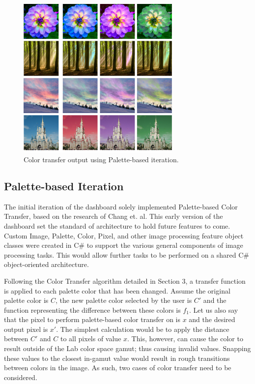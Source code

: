 \documentclass[sigchi]{acmart}
\begin{document}
\begin{figure}[t]
	\includegraphics[width=8cm]{Diffs}
	\caption{Color transfer output using Palette-based iteration.}
\end{figure}

\subsection{Palette-based Iteration}

The initial iteration of the dashboard solely implemented Palette-based Color Transfer, based on the research of Chang et. al. This early version of the dashboard set the standard of architecture to hold future features to come. Custom Image, Palette, Color, Pixel, and other image processing feature object classes were created in C\# to support the various general components of image processing tasks. This would allow further tasks to be performed on a shared C\# object-oriented architecture.

Following the Color Transfer algorithm detailed in Section 3, a transfer function is applied to each palette color that has been changed. Assume the original palette color is \(C\), the new palette color selected by the user is \(C'\) and the function representing the difference between these colors is \(f_1\). Let us also say that the pixel to perform palette-based color transfer on is \(x\) and the desired output pixel is \(x'\). The simplest calculation would be to apply the distance between \(C'\) and \(C\) to all pixels of value \(x\). This, however, can cause the color to result outside of the Lab color space gamut; thus causing invalid values. Snapping these values to the closest in-gamut value would result in rough transitions between colors in the image. As such, two cases of color transfer need to be considered.
\end{document}
